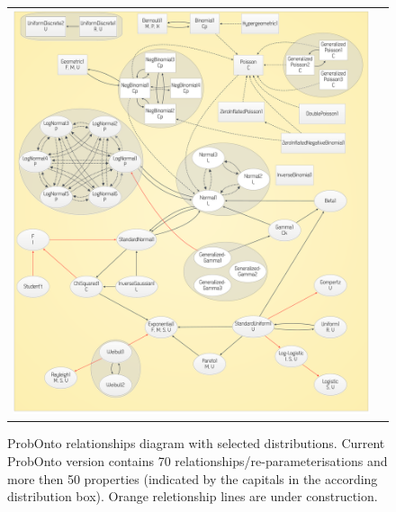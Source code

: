 \begin{figure}[htb!]
\centering
\begin{tabular}{cc}
 \includegraphics[width=170mm]{pics/POdiagram}
\end{tabular}
\caption{ProbOnto relationships diagram with selected distributions. 
Current ProbOnto version contains 70 relationships/re-parameterisations and 
more then 50 properties (indicated by the capitals in the according 
distribution box). Orange reletionship lines are under construction.}
\label{fig:POdiagram}
\end{figure}


